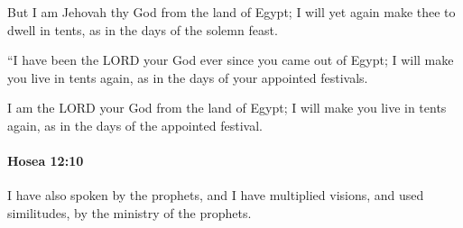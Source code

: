 			\begin{versebox}
					\item[BHS] 
					\item[LXX] 
					\item[ASV] But I am Jehovah thy God from the land of Egypt; I will yet again make thee to dwell in tents, as in the days of the solemn feast.
					\item[NIV] “I have been the LORD your God ever since you came out of Egypt; I will make you live in tents again, as in the days of your appointed festivals.
					\item[NRSV] I am the LORD your God from the land of Egypt; I will make you live in tents again, as in the days of the appointed festival.
			\end{versebox}

		\paragraph{Hosea 12:10} %
			\label{HOSEA-12-10}

			I have also spoken by the prophets, and I have multiplied visions, and used similitudes, by the ministry of the prophets.

